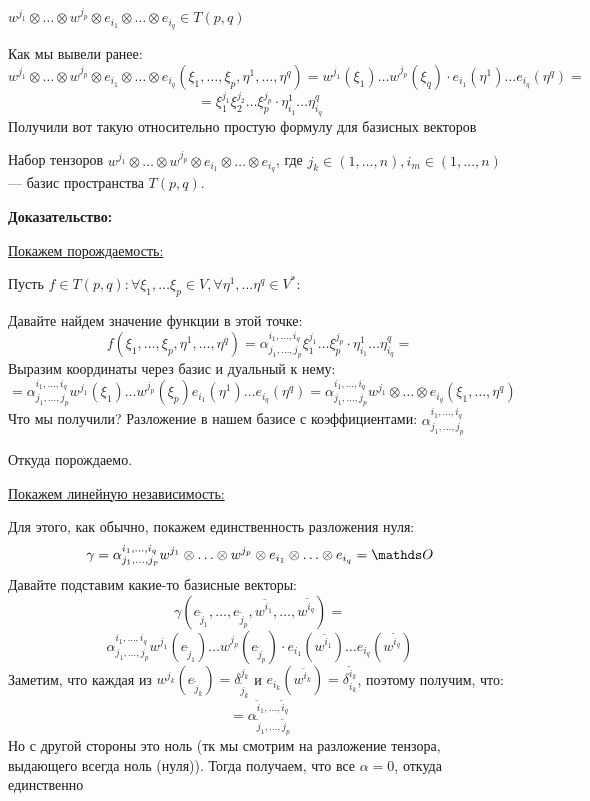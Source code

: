 $w^{j_1} \otimes \ldots \otimes w^{j_p} \otimes e_{i_1} \otimes \ldots \otimes  e_{i_q}\in T(p,q) $

Как мы вывели ранее:
$$w^{j_1}\otimes \ldots \otimes w^{j_p} \otimes e_{i_1}\otimes \ldots \otimes e_{i_q} (\xi_1,\ldots , \xi_p, \eta^1,\ldots,\eta^q) = w^{j_1}(\xi_1)\ldots w^{j_p}(\xi_q)\cdot e_{i_1}(\eta^1)\ldots e_{i_q}(\eta^q) = $$
$$=\xi_1^{j_1}\xi_2^{j_2}\ldots \xi_p^{j_p} \cdot \eta_{i_1}^1 \ldots \eta_{i_q}^q $$
Получили вот такую относительно простую формулу для базисных векторов



Набор тензоров $w^{j_1}\otimes \ldots \otimes w^{j_p} \otimes e_{i_1}\otimes \ldots \otimes e_{i_q}$, где $j_k \in (1,\ldots,n),i_m\in(1,\ldots,n)$ --- базис пространства $T(p,q)$.

\textbf{Доказательство:}


     \uline{Покажем порождаемость:}

    Пусть $f\in T(p,q): \forall \xi_1,\ldots \xi_p \in V, \forall \eta^1,\ldots \eta^q\in V^*:$

    Давайте найдем значение функции в этой точке:
    $$f(\xi_1,\ldots, \xi_p,\eta^1,\ldots, \eta^q) = \alpha_{j_1,\ldots,j_p}^{i_1,\ldots,i_q}\xi_1^{j_1}\ldots \xi_{p}^{j_p}\cdot \eta_{i_1}^1 \ldots \eta_{i_q}^q = $$
    Выразим координаты через базис и дуальный к нему:
    $$=\alpha_{j_1,\ldots,j_p}^{i_1,\ldots,i_q} w^{j_1}(\xi_1)\ldots w^{j_p}(\xi_p) e_{i_1}(\eta^1)\ldots e_{i_q}(\eta^q) = \alpha_{j_1,\ldots,j_p}^{i_1,\ldots,i_q} w^{j_1}\otimes \ldots \otimes e_{i_q}(\xi_1,\ldots, \eta^q)$$
    Что мы получили? Разложение в нашем базисе с коэффициентами: $\alpha_{j_1,\ldots,j_p}^{i_1,\ldots,i_q} $

    Откуда порождаемо.

    \uline{Покажем линейную независимость:}

    Для этого, как обычно, покажем единственность разложения нуля:
    $$\gamma = \alpha_{j_1,\ldots, j_p}^{i_1,\ldots,i_q}w^{j_1}\otimes\ldots\otimes w^{j_p}\otimes e_{i_1}\otimes \ldots \otimes e_{i_q}=\zero$$
    Давайте подставим какие-то базисные векторы:
    $$\gamma(e_{\widetilde{j}_1},\ldots, e_{\widetilde{j}_p}, w^{\widetilde{i}_1},\ldots, w^{\widetilde{i}_q}) = $$
    $$\alpha_{j_1,\ldots,j_p}^{i_1,\ldots,i_q}w^{j_1}(e_{\widetilde{j}_1})\ldots w^{j_p}(e_{\widetilde{j}_p}) \cdot e_{i_1}(w^{\widetilde{i}_1})\ldots e_{i_q}(w^{\widetilde{i}_q})$$
    Заметим, что каждая из $w^{j_k}(e_{\widetilde{j}_k}) = \delta_{\widetilde{j}_k}^{j_k}$ и $e_{i_k}(w^{\widetilde{i}_k}) = \delta^{\widetilde{i}_k}_{i_k}$, поэтому получим, что:
    $$ = \alpha_{\widetilde{j}_1,\ldots,\widetilde{j}_p}^{\widetilde{i}_1,\ldots, \widetilde{i}_q}$$
    Но с другой стороны это ноль (тк мы смотрим на разложение тензора, выдающего всегда ноль (нуля)). Тогда получаем, что все $\alpha = 0$, откуда единственно



